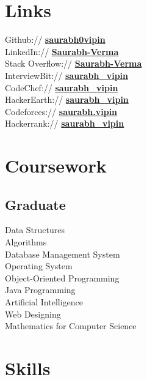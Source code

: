 \documentclass[]{deedy-resume-openfont}
\begin{document}
\begin{minipage}[t]{0.33\textwidth}
\section{Links} 
Github:// \href{https://github.com/saurabh0vipin}{\bf saurabh0vipin} \\
LinkedIn://  \href{https://www.linkedin.com/in/saurabh-verma-970117156/}{\bf Saurabh-Verma} \\
Stack Overflow://  \href{https://stackoverflow.com/users/10853514/saurabh-verma}{\bf Saurabh-Verma} \\
InterviewBit:// \href{https://www.interviewbit.com/profile/saurabh_vipin}{\bf saurabh\_vipin} \\
CodeChef:// \href{https://www.codechef.com/users/saurabh_vipin}{\bf saurabh\_vipin} \\
HackerEarth:// \href{https://www.hackerearth.com/@Saurabh_vipin}{\bf saurabh\_vipin} \\
Codeforces:// \href{http://codeforces.com/profile/saurabh.vipin}{\bf saurabh.vipin} \\
Hackerrank:// \href{https://www.hackerrank.com/Saurabh_vipin}{\bf saurabh\_vipin} \\ 


\section{Coursework}
\subsection{Graduate}
Data Structures \\
Algorithms \\
Database Management System \\
Operating System \\
Object-Oriented Programming \\
Java Programming \\
Artificial Intelligence \\
Web Designing \\
Mathematics for Computer Science \\
\sectionsep


\section{Skills}

\end{minipage}
\end{document}
